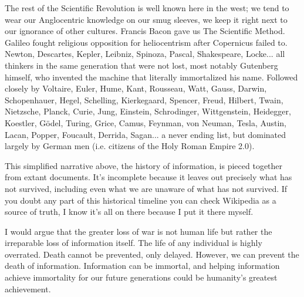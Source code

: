 The rest of the Scientific Revolution is well known here in the west; we tend to wear our Anglocentric knowledge on our smug sleeves, we keep it right next to our ignorance of other cultures. Francis Bacon gave us The Scientific Method. Galileo fought religious opposition for heliocentrism after Copernicus failed to. Newton, Descartes, Kepler, Leibniz, Spinoza, Pascal, Shakespeare, Locke... all thinkers in the same generation that were not lost, most notably Gutenberg himself, who invented the machine that literally immortalized his name. Followed closely by Voltaire, Euler, Hume, Kant, Rousseau, Watt, Gauss, Darwin, Schopenhauer, Hegel, Schelling, Kierkegaard, Spencer, Freud, Hilbert, Twain, Nietzsche, Planck, Curie, Jung, Einstein, Schrodinger, Wittgenstein, Heidegger, Koestler, G{\"o}del, Turing, Grice, Camus, Feynman, von Neuman, Tesla, Austin, Lacan, Popper, Foucault, Derrida, Sagan... a never ending list, but dominated largely by German men (i.e. citizens of the Holy Roman Empire 2.0).






This simplified narrative above, the history of information, is pieced together from extant documents. It's incomplete because it leaves out precisely what has not survived, including even what we are unaware of what has not survived. If you doubt any part of this historical timeline you can check Wikipedia as a source of truth, I know it's all on there because I put it there myself. 

I would argue that the greater loss of war is not human life but rather the irreparable loss of information itself. The life of any individual is highly overrated. Death cannot be prevented, only delayed. However, we can prevent the death of information. Information can be immortal, and helping information achieve immortality for our future generations could be humanity's greatest achievement. 




